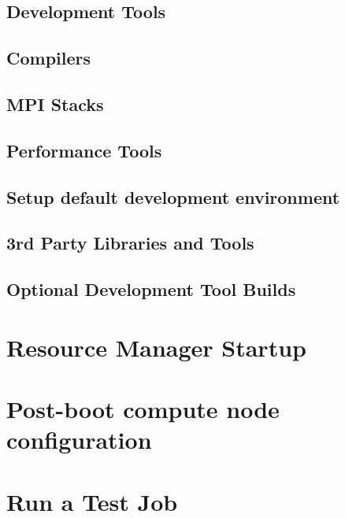 \documentclass{ohpc-doc}
\begin{document}
\section{Development Tools} \label{sec:install_dev_tools}


\section{Compilers} \label{sec:install_compilers}


\section{MPI Stacks} \label{sec:mpi}


\section{Performance Tools} \label{sec:install_perf_tools}


\section{Setup default development environment}


\section{3rd Party Libraries and Tools} \label{sec:3rdparty}





\section{Optional Development Tool Builds} \label{sec:3rdparty_intel}


\chapter{Resource Manager Startup} \label{sec:rms_startup}


\chapter{Post-boot compute node configuration} \label{sec:post_boot}


\chapter{Run a Test Job} \label{sec:test_job}


\appendix







\end{document}
